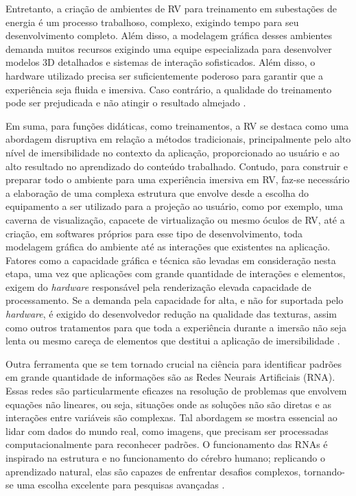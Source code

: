 Entretanto, a criação de ambientes de RV para treinamento em subestações de energia é um processo trabalhoso, complexo, exigindo tempo para seu desenvolvimento completo. Além disso, a modelagem gráfica desses ambientes demanda muitos recursos exigindo uma equipe especializada para desenvolver modelos 3D detalhados e sistemas de interação sofisticados. Além disso, o hardware utilizado precisa ser suficientemente poderoso para garantir que a experiência seja fluida e imersiva. Caso contrário, a qualidade do treinamento pode ser prejudicada e não atingir o resultado almejado \cite{barreto2022proposta}.

Em suma, para funções didáticas, como treinamentos, a RV se destaca como uma abordagem disruptiva em relação a métodos tradicionais, principalmente pelo alto nível de imersibilidade no contexto da aplicação, proporcionado ao usuário e ao alto resultado no aprendizado do conteúdo trabalhado. Contudo, para construir e preparar todo o ambiente para uma experiência imersiva em RV, faz-se necessário a elaboração de uma complexa estrutura que envolve desde a escolha do equipamento a ser utilizado para a projeção ao usuário, como por exemplo, uma caverna de visualização, capacete de virtualização ou mesmo óculos de RV, até a criação, em softwares próprios para esse tipo de desenvolvimento, toda modelagem gráfica do ambiente até as interações que existentes na aplicação. Fatores como a capacidade gráfica e técnica são levadas em consideração nesta etapa, uma vez que aplicações com grande quantidade de interações e elementos, exigem do \textit{hardware} responsável pela renderização elevada capacidade de processamento. Se a demanda pela capacidade for alta, e não for suportada pelo \textit{hardware}, é exigido do desenvolvedor redução na qualidade das texturas, assim como outros tratamentos para que toda a experiência durante a imersão não seja lenta ou mesmo careça de elementos que destitui a aplicação de imersibilidade \cite{palmeira2020uncanny}. 

Outra ferramenta que se tem tornado crucial na ciência para identificar padrões em grande quantidade de informações são as Redes Neurais Artificiais (RNA). Essas redes são particularmente eficazes na resolução de problemas que envolvem equações não lineares, ou seja, situações onde as soluções não são diretas e as interações entre variáveis são complexas. Tal abordagem se mostra essencial ao lidar com dados do mundo real, como imagens, que precisam ser processadas computacionalmente para reconhecer padrões. O funcionamento das RNAs é inspirado na estrutura e no funcionamento do cérebro humano; replicando o aprendizado natural, elas são capazes de enfrentar desafios complexos, tornando-se uma escolha excelente para pesquisas avançadas \cite{ougcu2012forecasting}.

